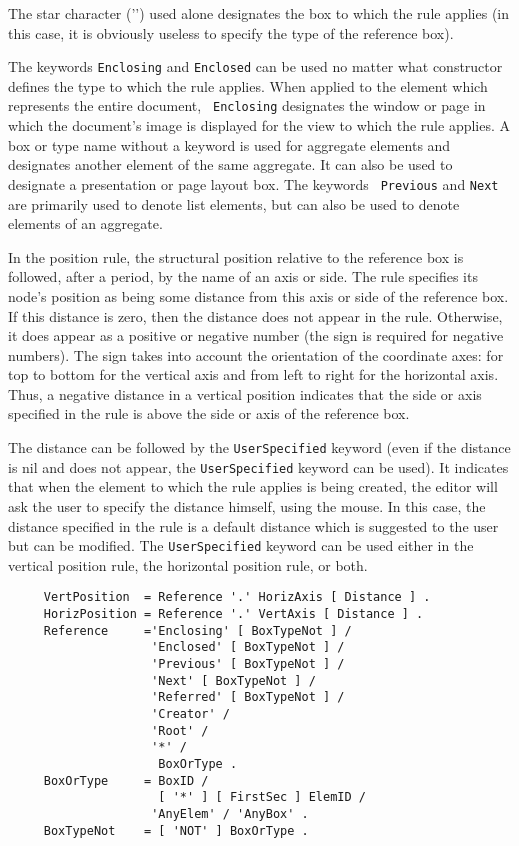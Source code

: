 The star character ('{\tt *}') used alone designates the box to which
the rule applies (in this case, it is obviously useless to specify the
type of the reference box).

The keywords {\tt Enclosing} and {\tt Enclosed} can be used no matter
what constructor defines the type to which the rule applies.  When
applied to the element which represents the entire document, {\tt
Enclosing} designates the window or page in which the document's image
is displayed for the view to which the rule applies.  A box or type
name without a keyword is used for aggregate elements and designates
another element of the same aggregate.  It can also be used to
designate a presentation or page layout box.  The keywords {\tt
Previous} and {\tt Next} are primarily used to denote list elements,
but can also be used to denote elements of an aggregate.

In the position rule, the structural position relative to the
reference box is followed, after a period, by the name of an axis or
side.  The rule specifies its node's position as being some distance
from this axis or side of the reference box.  If this distance is
zero, then the distance does not appear in the rule.  Otherwise, it
does appear as a positive or negative number (the sign is required for
negative numbers). The sign takes into account the orientation of the
coordinate axes: for top to bottom for the vertical axis and from left
to right for the horizontal axis.  Thus, a negative distance in a
vertical position indicates that the side or axis specified in the rule
is above the side or axis of the reference box. 

The distance can be followed by the {\tt UserSpecified} keyword (even
if the distance is nil and does not appear, the {\tt UserSpecified}
keyword can be used).  It indicates that when the element to which the
rule applies is being created, the editor will ask the user to specify
the distance himself, using the mouse.  In this case, the distance
specified in the rule is a default distance which is suggested to the
user but can be modified.  The {\tt UserSpecified} keyword can be used
either in the vertical position rule, the horizontal position rule, or
both.

\begin{verbatim}
     VertPosition  = Reference '.' HorizAxis [ Distance ] .
     HorizPosition = Reference '.' VertAxis [ Distance ] .
     Reference     ='Enclosing' [ BoxTypeNot ] /
                    'Enclosed' [ BoxTypeNot ] /
                    'Previous' [ BoxTypeNot ] /
                    'Next' [ BoxTypeNot ] /
                    'Referred' [ BoxTypeNot ] /
                    'Creator' /
                    'Root' /
                    '*' /
                     BoxOrType .
     BoxOrType     = BoxID /
                     [ '*' ] [ FirstSec ] ElemID /
                    'AnyElem' / 'AnyBox' .
     BoxTypeNot    = [ 'NOT' ] BoxOrType .
\end{verbatim}

